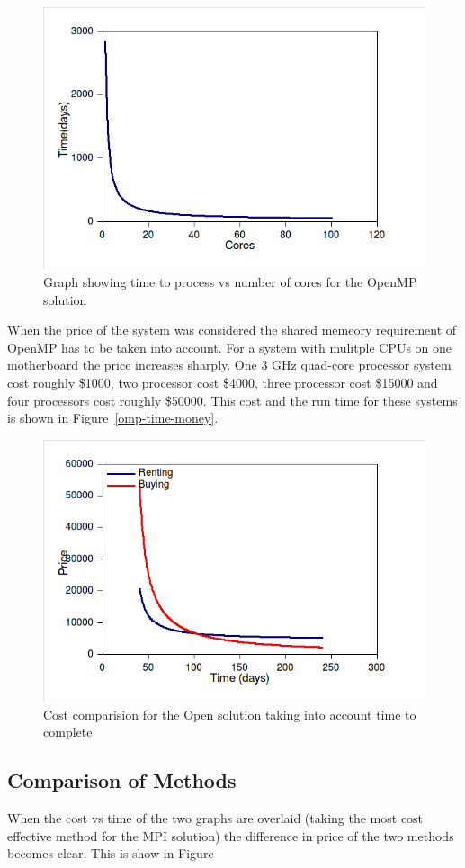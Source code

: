 \begin{figure}[ht]
	\begin{center}
		\includegraphics[width=1.0\textwidth]{mpi-time-cores}
	\end{center}
	\caption{Graph showing time to process vs number of cores for the OpenMP solution}
	\label{mpi-time-cores}
\end{figure}

When the price of the system was considered the shared memeory requirement of OpenMP has to be taken into account. For a system with mulitple CPUs on one motherboard the price increases sharply. One 3 GHz quad-core processor system cost roughly \$1000, two processor cost \$4000, three processor cost \$15000 and four processors cost roughly \$50000. This cost and the run time for these systems is shown in Figure~\ref{omp-time-money}.

\begin{figure}[ht]
	\begin{center}
		\includegraphics[width=1.0\textwidth]{mpi-time-money}
	\end{center}
	\caption{Cost comparision for the Open solution taking into account time to complete}
	\label{mpi-time-money}
\end{figure}


\subsection{Comparison of Methods}

When the cost vs time of the two graphs are overlaid (taking the most cost effective method for the MPI solution) the difference in price of the two methods becomes clear. This is show in Figure~
